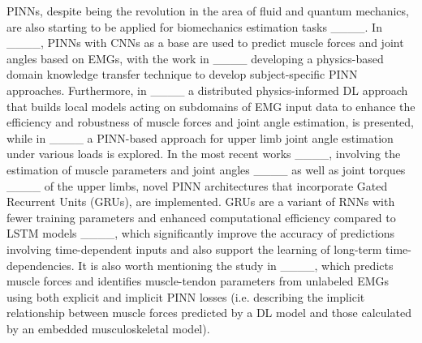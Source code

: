 PINNs, despite being the revolution in the area of fluid and quantum mechanics, are also starting to be applied for biomechanics estimation tasks ____. In ____, PINNs with CNNs as a base are used to predict muscle forces and joint angles based on EMGs, with the work in ____ developing a physics-based domain knowledge transfer technique to develop subject-specific PINN approaches. Furthermore, in ____ a distributed physics-informed DL approach that builds local models acting on subdomains of EMG input data to enhance the efficiency and robustness of muscle forces and joint angle estimation, is presented, while in ____ a PINN-based approach for upper limb joint angle estimation under various loads is explored.
In the most recent works ____, involving the estimation of muscle parameters and joint angles ____ as well as joint torques ____ of the upper limbs, novel PINN architectures that incorporate Gated Recurrent Units (GRUs), are implemented. GRUs are a variant of RNNs with fewer training parameters and enhanced computational efficiency compared to LSTM models ____, which significantly improve the accuracy of predictions involving time-dependent inputs and also support the learning of long-term time-dependencies. It is also worth mentioning the study in ____, which predicts muscle forces and identifies muscle-tendon parameters from unlabeled EMGs using both explicit and implicit PINN losses (i.e. describing the implicit relationship between muscle forces predicted by a DL model and those calculated by an embedded musculoskeletal model). 

